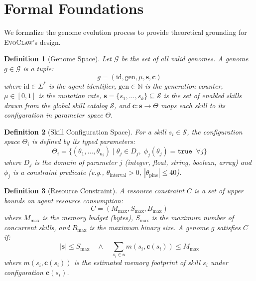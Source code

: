 \documentclass{article}
\newtheorem{definition}{Definition}
\newcommand{\evoclaw}{\textsc{EvoClaw}}
\newcommand{\genomespace}{\mathcal{G}}
\newcommand{\skillset}{\mathcal{S}}
\begin{document}

\section{Formal Foundations}
\label{sec:formal}

We formalize the genome evolution process to provide theoretical grounding for \evoclaw{}'s design.

\begin{definition}[Genome Space]
Let $\genomespace$ be the set of all valid genomes. A genome $g \in \genomespace$ is a tuple:
\begin{equation}
    g = (\text{id}, \text{gen}, \mu, \mathbf{s}, \mathbf{c})
\end{equation}
where $\text{id} \in \Sigma^*$ is the agent identifier, $\text{gen} \in \mathbb{N}$ is the generation counter, $\mu \in [0, 1]$ is the mutation rate, $\mathbf{s} = \{s_1, \ldots, s_k\} \subseteq \skillset$ is the set of enabled skills drawn from the global skill catalog $\skillset$, and $\mathbf{c} : \mathbf{s} \to \Theta$ maps each skill to its configuration in parameter space $\Theta$.
\end{definition}

\begin{definition}[Skill Configuration Space]
For a skill $s_i \in \skillset$, the configuration space $\Theta_i$ is defined by its typed parameters:
\begin{equation}
    \Theta_i = \{(\theta_1, \ldots, \theta_{n_i}) \mid \theta_j \in D_j, \; \phi_j(\theta_j) = \texttt{true} \;\; \forall j\}
\end{equation}
where $D_j$ is the domain of parameter $j$ (integer, float, string, boolean, array) and $\phi_j$ is a constraint predicate (e.g., $\theta_{\text{interval}} > 0$, $|\theta_{\text{pins}}| \leq 40$).
\end{definition}

\begin{definition}[Resource Constraint]
A resource constraint $C$ is a set of upper bounds on agent resource consumption:
\begin{equation}
    C = (M_{\max}, S_{\max}, B_{\max})
\end{equation}
where $M_{\max}$ is the memory budget (bytes), $S_{\max}$ is the maximum number of concurrent skills, and $B_{\max}$ is the maximum binary size. A genome $g$ \textit{satisfies} $C$ if:
\begin{equation}
    |\mathbf{s}| \leq S_{\max} \quad \wedge \quad \sum_{s_i \in \mathbf{s}} m(s_i, \mathbf{c}(s_i)) \leq M_{\max}
\end{equation}
where $m(s_i, \mathbf{c}(s_i))$ is the estimated memory footprint of skill $s_i$ under configuration $\mathbf{c}(s_i)$.
\end{definition}
\end{document}
